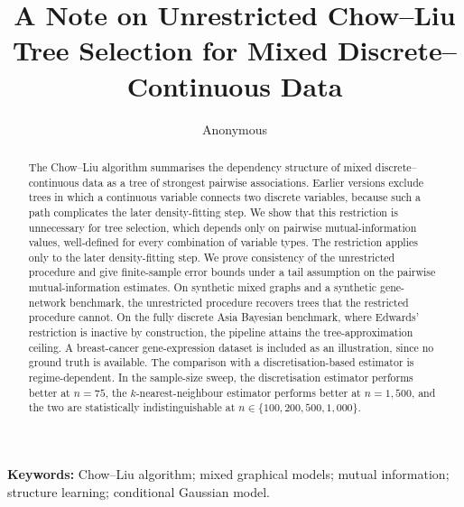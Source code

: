 \newtheorem{proposition}{Proposition}
\newtheorem{corollary}{Corollary}
\theoremstyle{remark}
\newtheorem*{remark}{Remark}


\title{A Note on Unrestricted Chow--Liu Tree Selection for Mixed
Discrete--Continuous Data}

\author{Anonymous}

\date{}


\maketitle

\begin{abstract}
The Chow--Liu algorithm summarises the dependency structure of
mixed discrete--continuous data as a tree of strongest pairwise
associations. Earlier versions exclude trees in which a
continuous variable connects two discrete variables, because such
a path complicates the later density-fitting step. We show that
this restriction is unnecessary for tree selection, which depends
only on pairwise mutual-information values, well-defined for
every combination of variable types. The restriction applies only
to the later density-fitting step. We prove consistency of the unrestricted
procedure and give finite-sample error bounds under a tail
assumption on the pairwise mutual-information estimates. On synthetic mixed graphs and a
synthetic gene-network benchmark, the unrestricted procedure
recovers trees that the restricted procedure cannot. On the
fully discrete Asia Bayesian benchmark, where Edwards'
restriction is inactive by construction, the pipeline attains the
tree-approximation ceiling. A breast-cancer gene-expression
dataset is included as an illustration, since no ground truth is
available. The comparison with a discretisation-based estimator is
regime-dependent. In the sample-size sweep, the discretisation
estimator performs better at $n = 75$, the
$k$-nearest-neighbour estimator performs better at
$n = 1{,}500$, and the two are statistically indistinguishable
at $n \in \{100, 200, 500, 1{,}000\}$.
\end{abstract}

\medskip
\noindent\textbf{Keywords:} Chow--Liu algorithm; mixed graphical
models; mutual information; structure learning; conditional Gaussian
model.

